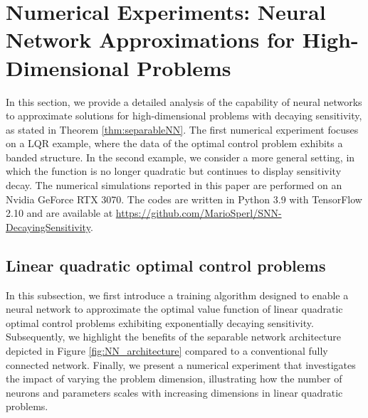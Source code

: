 \documentclass{article}
\begin{document}
\section{Numerical Experiments: Neural Network Approximations for High-Dimensional Problems} \label{sec:num}

In this section, we provide a detailed analysis of the capability of neural networks to approximate solutions for high-dimensional problems with decaying sensitivity, as stated in Theorem \ref{thm:separableNN}. The first numerical experiment focuses on a LQR example, where the data of the optimal control problem exhibits a banded structure. In the second example, we consider a more general setting, in which the function is no longer quadratic but continues to display sensitivity decay.
The numerical simulations reported in this paper are performed on an Nvidia GeForce RTX 3070. The codes are written in Python 3.9 with TensorFlow 2.10 and are available at \url{https://github.com/MarioSperl/SNN-DecayingSensitivity}.

\subsection{Linear quadratic optimal control problems} \label{subsec:Numerics_LQR}
In this subsection, we first introduce a training algorithm designed to enable a neural network to approximate the optimal value function of linear quadratic optimal control problems exhibiting exponentially decaying sensitivity. Subsequently, we highlight the benefits of the separable network architecture depicted in Figure \ref{fig:NN_architecture} compared to a conventional fully connected network. Finally, we present a numerical experiment that investigates the impact of varying the problem dimension, illustrating how the number of neurons and parameters scales with increasing dimensions in linear quadratic problems.
\end{document}
